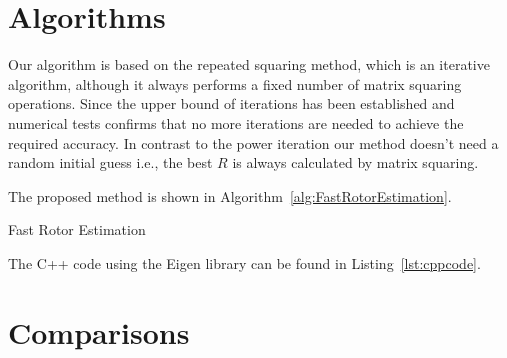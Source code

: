 \documentclass{birkjour}
\numberwithin{equation}{section}
\begin{document}
\section{Algorithms}

Our algorithm is based on the repeated squaring method, which is an iterative algorithm, although it always performs a fixed number of matrix squaring operations. Since the upper bound of iterations has been established and numerical tests confirms that no more iterations are needed to achieve the required accuracy. In contrast to the power iteration our method doesn't need a random initial guess i.e., the best $R$ is always calculated by matrix squaring.

The proposed method is shown in Algorithm~\ref{alg:FastRotorEstimation}. 

\begin{algorithm}
\begin{algorithmic}[1]
\ENDFOR
{}
\ENDFOR
{}
\end{algorithmic}
\caption{Fast Rotor Estimation}\label{alg:FastRotorEstimation}
\end{algorithm}
The C++ code using the Eigen library can be found in Listing~\ref{lst:cppcode}.

\section{Comparisons}
\end{document}
